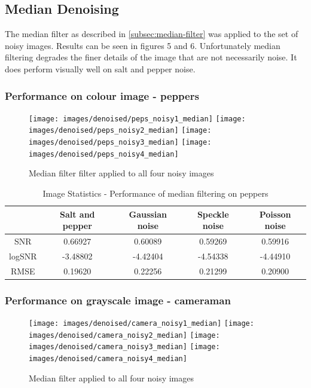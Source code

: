 \documentclass{article}
\begin{document}
\subsection{Median Denoising}
\label{subsec:median-denoise}
The median filter as described in \ref{subsec:median-filter} was applied to the set of
noisy images. Results can be seen in figures 5 and 6. Unfortunately
median filtering degrades the finer details of the image that are not
necessarily noise. It does perform visually well on salt and pepper noise.
\subsubsection{Performance on colour image - peppers}
\begin{figure}[H]
  \centering
  \texttt{[image: images/denoised/peps\_noisy1\_median]}
  \texttt{[image: images/denoised/peps\_noisy2\_median]}
  \texttt{[image: images/denoised/peps\_noisy3\_median]}
  \texttt{[image: images/denoised/peps\_noisy4\_median]}
  \caption{Median filter filter applied to all four noisy images }
\end{figure}
\begin{table}[H]
  \centering
  \begin{tabular}{c|c|c|c|c}
    & Salt and pepper & Gaussian noise & Speckle noise & Poisson noise \\
    \hline
    SNR    & 0.66927  & 0.60089  & 0.59269  & 0.59916  \\
    logSNR & -3.48802 & -4.42404 & -4.54338 & -4.44910 \\
    RMSE   & 0.19620  & 0.22256  & 0.21299  & 0.20900  \\
  \end{tabular}
  \caption{Image Statistics - Performance of median filtering on peppers }
\end{table}

\subsubsection{Performance on grayscale image - cameraman}
\begin{figure}[H]
  \centering
  \texttt{[image: images/denoised/camera\_noisy1\_median]}
  \texttt{[image: images/denoised/camera\_noisy2\_median]}
  \texttt{[image: images/denoised/camera\_noisy3\_median]}
  \texttt{[image: images/denoised/camera\_noisy4\_median]}
  \caption{Median filter applied to all four noisy images }
\end{figure}
\end{document}
